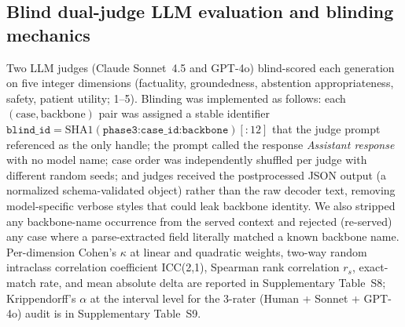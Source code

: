 \documentclass[11pt]{article}
\begin{document}
\subsection{Blind dual-judge LLM evaluation and blinding mechanics}
\label{sec:methods_judge}
Two LLM judges (Claude Sonnet~4.5 and GPT-4o) blind-scored each generation on five integer dimensions (factuality, groundedness, abstention appropriateness, safety, patient utility; 1--5). Blinding was implemented as follows: each $(\text{case}, \text{backbone})$ pair was assigned a stable identifier $\texttt{blind\_id} = \mathrm{SHA1}(\texttt{phase3:case\_id:backbone})[:12]$ that the judge prompt referenced as the only handle; the prompt called the response \emph{Assistant response} with no model name; case order was independently shuffled per judge with different random seeds; and judges received the postprocessed JSON output (a normalized schema-validated object) rather than the raw decoder text, removing model-specific verbose styles that could leak backbone identity. We also stripped any backbone-name occurrence from the served context and rejected (re-served) any case where a parse-extracted field literally matched a known backbone name. Per-dimension Cohen's $\kappa$ \citep{cohen1960kappa,landis1977kappa} at linear and quadratic weights, two-way random intraclass correlation coefficient ICC(2,1), Spearman rank correlation $r_s$, exact-match rate, and mean absolute delta are reported in Supplementary Table~S8; Krippendorff's $\alpha$ at the interval level \citep{krippendorff2018content,hayes2007krippendorff} for the 3-rater (Human + Sonnet + GPT-4o) audit is in Supplementary Table~S9.
\end{document}
